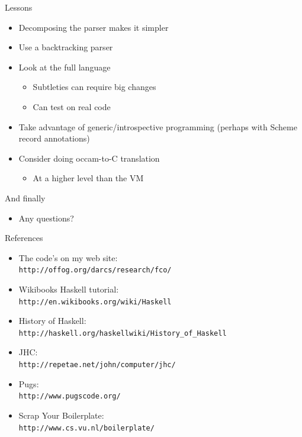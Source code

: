 \documentclass[adam,pdf,slideColor]{prosper}
\begin{document}
\begin{slide}{Lessons}
\begin{itemize}
\item Decomposing the parser makes it simpler
\item Use a backtracking parser
\item Look at the full language
\begin{itemize}
\item Subtleties can require big changes
\item Can test on real code
\end{itemize}
\item Take advantage of generic/introspective programming (perhaps
  with Scheme record annotations)
\item Consider doing occam-to-C translation
\begin{itemize}
\item At a higher level than the VM
\end{itemize}
\end{itemize}
\end{slide}

\begin{slide}{And finally}
\begin{itemize}
\item Any questions?
\end{itemize}
\end{slide}

\begin{slide}{References}
\begin{itemize}
\item The code's on my web site: \\
\verb|http://offog.org/darcs/research/fco/|
\item Wikibooks Haskell tutorial: \\
\verb|http://en.wikibooks.org/wiki/Haskell|
\item History of Haskell: \\
{\tiny \verb|http://haskell.org/haskellwiki/History_of_Haskell|}
\item JHC: \\
\verb|http://repetae.net/john/computer/jhc/|
\item Pugs: \\
\verb|http://www.pugscode.org/|
\item Scrap Your Boilerplate: \\
\verb|http://www.cs.vu.nl/boilerplate/|
\end{itemize}
\end{slide}
\end{document}
